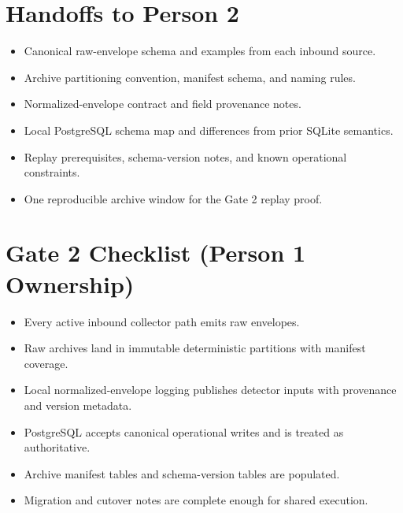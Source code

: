 \documentclass{article}
\begin{document}
\section*{Handoffs to Person 2}
\begin{itemize}
\item Canonical raw-envelope schema and examples from each inbound source.
\item Archive partitioning convention, manifest schema, and naming rules.
\item Normalized-envelope contract and field provenance notes.
\item Local PostgreSQL schema map and differences from prior SQLite semantics.
\item Replay prerequisites, schema-version notes, and known operational constraints.
\item One reproducible archive window for the Gate 2 replay proof.
\end{itemize}

\section*{Gate 2 Checklist (Person 1 Ownership)}
\begin{itemize}
\item Every active inbound collector path emits raw envelopes.
\item Raw archives land in immutable deterministic partitions with manifest coverage.
\item Local normalized-envelope logging publishes detector inputs with provenance and version metadata.
\item PostgreSQL accepts canonical operational writes and is treated as authoritative.
\item Archive manifest tables and schema-version tables are populated.
\item Migration and cutover notes are complete enough for shared execution.
\end{itemize}
\end{document}
